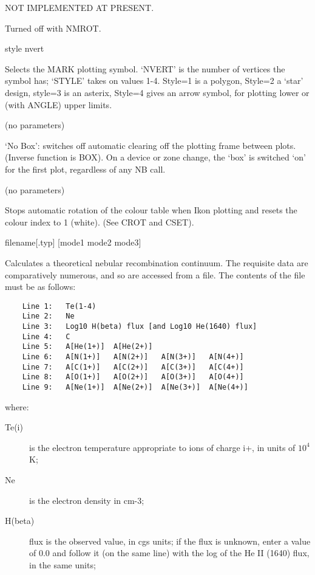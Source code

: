 \begin {description}
NOT IMPLEMENTED AT PRESENT.

Turned off with NMROT.

\item [MSET] style nvert

Selects the MARK plotting symbol. `NVERT' is the number of vertices
the symbol has; `STYLE' takes on values 1-4. Style=1 is a polygon,
Style=2 a `star' design, style=3 is an asterix, Style=4 gives an arrow
symbol, for plotting lower or (with ANGLE) upper limits.

\item [NB] (no parameters)

`No Box': switches off automatic clearing off the plotting frame
between plots. (Inverse function is BOX). On a device or zone change,
the `box' is switched `on' for the first plot, regardless of any NB
call.

\item [NCROT] (no parameters)

Stops automatic rotation of the colour table when Ikon plotting and
resets the colour index to 1 (white). (See CROT and CSET).

\item [NEBCONT] filename[.typ] [mode1 mode2 mode3]

Calculates a theoretical nebular recombination continuum. The
requisite data are comparatively numerous, and so are accessed from a
file. The contents of the file must be as follows:

\begin{verbatim}
    Line 1:   Te(1-4)
    Line 2:   Ne
    Line 3:   Log10 H(beta) flux [and Log10 He(1640) flux]
    Line 4:   C
    Line 5:   A[He(1+)]  A[He(2+)]
    Line 6:   A[N(1+)]   A[N(2+)]   A[N(3+)]   A[N(4+)]
    Line 7:   A[C(1+)]   A[C(2+)]   A[C(3+)]   A[C(4+)]
    Line 8:   A[O(1+)]   A[O(2+)]   A[O(3+)]   A[O(4+)]
    Line 9:   A[Ne(1+)]  A[Ne(2+)]  A[Ne(3+)]  A[Ne(4+)]
\end{verbatim}

where:

\begin{description}
\begin{description}

\item [Te(i)] is the electron temperature appropriate to ions of
charge i+, in units of $10^{4}$K;

\item [Ne] is the electron density in cm-3;

\item [H(beta)] flux is the observed value, in cgs units; if the flux
is unknown, enter a value of 0.0 and follow it (on the same line) with
the log of the He II (1640) flux, in the same units;


\end{description}
\end{description}
\end{description}
